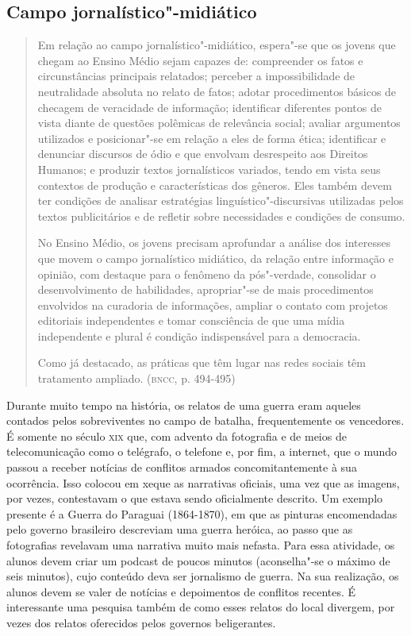 \documentclass[12pt]{extarticle}
\begin{document}
\subsection{Campo jornalístico"-midiático}

\begin{quote}
Em relação ao campo jornalístico"-midiático, espera"-se que os jovens
que chegam ao Ensino Médio sejam capazes de: compreender os fatos e
circunstâncias principais relatados; perceber a impossibilidade de
neutralidade absoluta no relato de fatos; adotar procedimentos básicos
de checagem de veracidade de informação; identificar diferentes pontos
de vista diante de questões polêmicas de relevância social; avaliar
argumentos utilizados e posicionar"-se em relação a eles de forma ética;
identificar e denunciar discursos de ódio e que envolvam desrespeito aos
Direitos Humanos; e produzir textos jornalísticos variados, tendo em
vista seus contextos de produção e características dos gêneros. Eles
também devem ter condições de analisar estratégias
linguístico"-discursivas utilizadas pelos textos publicitários e de
refletir sobre necessidades e condições de consumo.

No Ensino Médio, os jovens precisam aprofundar a análise dos interesses
que movem o campo jornalístico midiático, da relação entre informação e
opinião, com destaque para o fenômeno da pós"-verdade, consolidar o
desenvolvimento de habilidades, apropriar"-se de mais procedimentos
envolvidos na curadoria de informações, ampliar o contato com projetos
editoriais independentes e tomar consciência de que uma mídia
independente e plural é condição indispensável para a democracia.

Como já destacado, as práticas que têm lugar nas redes sociais têm
tratamento ampliado. (\textsc{bncc}, p. 494-495)
\end{quote}

Durante muito tempo na história, os relatos de uma guerra eram aqueles
contados pelos sobreviventes no campo de batalha, frequentemente os
vencedores. É somente no século \textsc{xix} que, com advento da fotografia e
de meios de telecomunicação como o telégrafo, o telefone e, por fim, a
internet, que o mundo passou a receber notícias de conflitos armados
concomitantemente à sua ocorrência. Isso colocou em xeque as
narrativas oficiais, uma vez que as imagens, por vezes, contestavam o
que estava sendo oficialmente descrito. Um exemplo presente é a Guerra
do Paraguai (1864-1870), em que as pinturas encomendadas pelo governo
brasileiro descreviam uma guerra heróica, ao passo que as fotografias
revelavam uma narrativa muito mais nefasta. Para essa atividade, os
alunos devem criar um podcast de poucos minutos (aconselha"-se o máximo
de seis minutos), cujo conteúdo deva ser jornalismo de guerra. Na sua
realização, os alunos devem se valer de notícias e depoimentos de
conflitos recentes. É interessante uma pesquisa também de como esses
relatos do local divergem, por vezes dos relatos oferecidos pelos
governos beligerantes.
\end{document}

